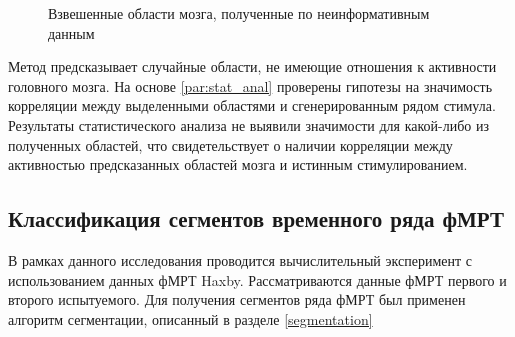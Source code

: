 \begin{figure}[h!]
	\centering
	\hfill
	\hfill
 \caption{Взвешенные области мозга, полученные по неинформативным данным}
\label{fig:correctness}
\end{figure}
Метод предсказывает случайные области, не имеющие отношения к активности головного мозга. 
На основе \ref{par:stat_anal} проверены гипотезы на значимость корреляции между выделенными областями и сгенерированным рядом стимула. Результаты статистического анализа не выявили значимости для какой-либо из полученных областей, что свидетельствует о наличии корреляции между активностью предсказанных областей мозга и истинным стимулированием.
\subsection{Классификация сегментов временного ряда фМРТ}
В рамках данного исследования проводится вычислительный эксперимент с использованием данных фМРТ Haxby. Рассматриваются данные фМРТ первого и второго испытуемого. Для получения сегментов ряда фМРТ был применен алгоритм сегментации, описанный в разделе \ref{segmentation}

